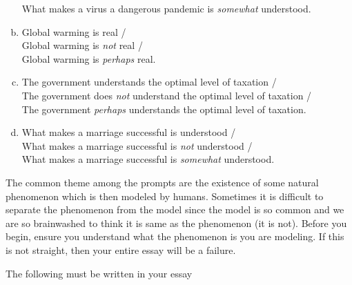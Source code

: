 \documentclass[12pt]{article}
\begin{document}
\begin{enumerate}[(a)]
What makes a virus a dangerous pandemic is \emph{somewhat} understood.
\item Global warming is real / \\
Global warming is \textit{not} real / \\
Global warming is \textit{perhaps} real.
\item The government understands the optimal level of taxation / \\
The government does \textit{not} understand the optimal level of taxation / \\
The government \textit{perhaps} understands the optimal level of taxation.
\item What makes a marriage successful is understood / \\
What makes a marriage successful is \emph{not} understood / \\
What makes a marriage successful is \emph{somewhat} understood.
\end{enumerate}

The common theme among the prompts are the existence of some natural phenomenon which is then modeled by humans. Sometimes it is difficult to separate the phenomenon from the model since the model is so common and we are so brainwashed to think it is same as the phenomenon (it is not). Before you begin, ensure you understand what the phenomenon is you are modeling. If this is not straight, then your entire essay will be a failure.

The following must be written in your essay
\end{document}
